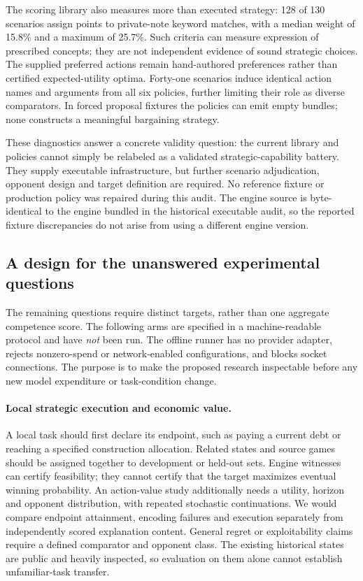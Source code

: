 The scoring library also measures more than executed strategy: 128 of 130 scenarios assign points to private-note keyword matches, with a median weight of 15.8\% and a maximum of 25.7\%. Such criteria can measure expression of prescribed concepts; they are not independent evidence of sound strategic choices. The supplied preferred actions remain hand-authored preferences rather than certified expected-utility optima. Forty-one scenarios induce identical action names and arguments from all six policies, further limiting their role as diverse comparators. In forced proposal fixtures the policies can emit empty bundles; none constructs a meaningful bargaining strategy.

These diagnostics answer a concrete validity question: the current library and policies cannot simply be relabeled as a validated strategic-capability battery. They supply executable infrastructure, but further scenario adjudication, opponent design and target definition are required. No reference fixture or production policy was repaired during this audit. The engine source is byte-identical to the engine bundled in the historical executable audit, so the reported fixture discrepancies do not arise from using a different engine version.

\subsection{A design for the unanswered experimental questions}
\label{sec:agenda-prospective-evaluation}

The remaining questions require distinct targets, rather than one aggregate competence score. The following arms are specified in a machine-readable protocol and have \emph{not} been run. The offline runner has no provider adapter, rejects nonzero-spend or network-enabled configurations, and blocks socket connections. The purpose is to make the proposed research inspectable before any new model expenditure or task-condition change.

\paragraph{Local strategic execution and economic value.}
A local task should first declare its endpoint, such as paying a current debt or reaching a specified construction allocation. Related states and source games should be assigned together to development or held-out sets. Engine witnesses can certify feasibility; they cannot certify that the target maximizes eventual winning probability. An action-value study additionally needs a utility, horizon and opponent distribution, with repeated stochastic continuations. We would compare endpoint attainment, encoding failures and execution separately from independently scored explanation content. General regret or exploitability claims require a defined comparator and opponent class. The existing historical states are public and heavily inspected, so evaluation on them alone cannot establish unfamiliar-task transfer.

